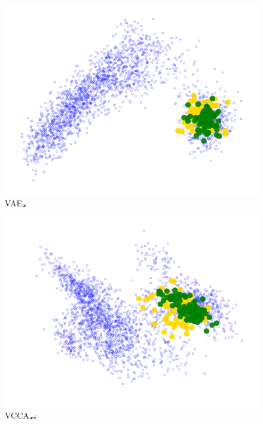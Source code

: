 \begin{subfigure}[b]{0.3\textwidth}
	\centering
	\includegraphics[width=\textwidth]{Chapter1/pics_paperB/pca_latents_juice_yoghurt_vae_seed2}
	\vspace{-8mm}
	\caption{VAE$_{{\bm{x}}}$}
\label{fig:pca_latents_vae_juice_yoghurt}
\end{subfigure}
\hfill
\begin{subfigure}[b]{0.3\textwidth}
	\centering
	\includegraphics[width=\textwidth]{Chapter1/pics_paperB/pca_latents_juice_yoghurt_vcca_xi_seed2}
	\vspace{-8mm}
	\caption{VCCA$_{{\bm{x}}{\bm{i}}}$}
\label{fig:pca_latents_vcca_xi_juice_yoghurt}
\end{subfigure} 
